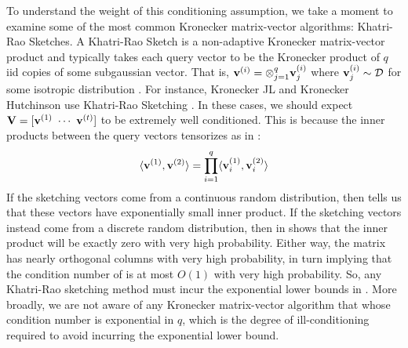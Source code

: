 To understand the weight of this conditioning assumption, we take a moment to examine some of the most common Kronecker matrix-vector algorithms: Khatri-Rao Sketches.
A Khatri-Rao Sketch is a non-adaptive Kronecker matrix-vector product and typically takes each query vector to be the Kronecker product of \(q\) iid copies of some subgaussian vector.
That is, \(\boldsymbol{\mathrm{v}}^{(i)} = \otimes_{j=1}^q \boldsymbol{\mathrm{v}}^{(i)}_j\) where \(\boldsymbol{\mathrm{v}}^{(i)}_j \sim {\mathcal D}\) for some isotropic distribution \cD.
For instance, Kronecker JL and Kronecker Hutchinson use Khatri-Rao Sketching \cite{jin2021faster,sun2021tensor,feldman2022entanglement,bujanovic2021norm,meyer2023hutchinson,lam2024randomized}.
In these cases, we should expect \(\mathbf{V} = [\boldsymbol{\mathrm{v}}^{(1)} ~ \cdots ~ \boldsymbol{\mathrm{v}}^{(t)}]\) to be extremely well conditioned.
This is because the inner products between the query vectors tensorizes as in :
\begin{equation*}
    \langle \boldsymbol{\mathrm{v}}^{(1)}, \boldsymbol{\mathrm{v}}^{(2)} \rangle
    = \prod_{i=1}^q \langle \boldsymbol{\mathrm{v}}^{(1)}_i, \boldsymbol{\mathrm{v}}^{(2)}_i\rangle
\end{equation*}
If the sketching vectors come from a continuous random distribution, then  tells us that these vectors have exponentially small inner product.
If the sketching vectors instead come from a discrete random distribution, then  in  shows that the inner product will be exactly zero with very high probability.
Either way, the matrix \mV has nearly orthogonal columns with very high probability, in turn implying that the condition number of \mV is at most \(O(1)\) with very high probability.
So, any Khatri-Rao sketching method must incur the exponential lower bounds in .
More broadly, we are not aware of any Kronecker matrix-vector algorithm that whose condition number is exponential in \(q\), which is the degree of ill-conditioning required to avoid incurring the exponential lower bound.


